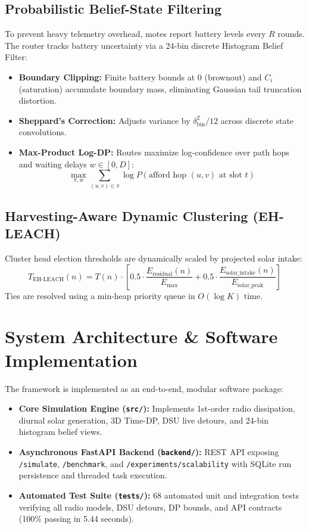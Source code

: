 \documentclass[journal]{IEEEtran}
\begin{document}
\subsection{Probabilistic Belief-State Filtering}
To prevent heavy telemetry overhead, motes report battery levels every $R$ rounds. The router tracks battery uncertainty via a 24-bin discrete Histogram Belief Filter:
\begin{itemize}
    \item \textbf{Boundary Clipping:} Finite battery bounds at 0 (brownout) and $C_i$ (saturation) accumulate boundary mass, eliminating Gaussian tail truncation distortion.
    \item \textbf{Sheppard's Correction:} Adjusts variance by $\delta_{\text{bin}}^2 / 12$ across discrete state convolutions.
    \item \textbf{Max-Product Log-DP:} Routes maximize log-confidence over path hops and waiting delays $w \in [0, D]$:
    \begin{equation}
    \max_{\pi, w} \sum_{(u, v) \in \pi} \log P(\text{afford hop } (u, v) \text{ at slot } t)
    \end{equation}
\end{itemize}

\subsection{Harvesting-Aware Dynamic Clustering (EH-LEACH)}
Cluster head election thresholds are dynamically scaled by projected solar intake:
\begin{equation}
T_{\text{EH-LEACH}}(n) = T(n) \cdot \left[ 0.5 \cdot \frac{E_{\text{residual}}(n)}{E_{\text{max}}} + 0.5 \cdot \frac{E_{\text{solar\_intake}}(n)}{E_{\text{solar\_peak}}} \right]
\end{equation}
Ties are resolved using a min-heap priority queue in $O(\log K)$ time.

\section{System Architecture \& Software Implementation}

The framework is implemented as an end-to-end, modular software package:
\begin{itemize}
    \item \textbf{Core Simulation Engine (\texttt{src/}):} Implements 1st-order radio dissipation, diurnal solar generation, 3D Time-DP, DSU live detours, and 24-bin histogram belief views.
    \item \textbf{Asynchronous FastAPI Backend (\texttt{backend/}):} REST API exposing \texttt{/simulate}, \texttt{/benchmark}, and \texttt{/experiments/scalability} with SQLite run persistence and threaded task execution.
    \item \textbf{Automated Test Suite (\texttt{tests/}):} 68 automated unit and integration tests verifying all radio models, DSU detours, DP bounds, and API contracts (100\% passing in 5.44 seconds).
\end{itemize}
\end{document}
